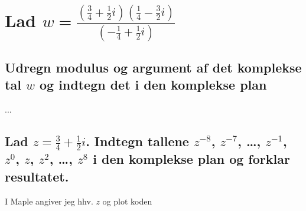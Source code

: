 \documentclass[11pt,a4paper]{article}
\begin{document}
\section{\mdseries
    Lad $w = \frac
        {
        \left(
            \frac{3}{4} + \frac{1}{2}i
        \right)
        \left(
             \frac{1}{4} - \frac{3}{2}i
        \right)
        }
        {
        \left(
            -\frac{1}{4} + \frac{1}{2}i
        \right)
        }$
}

\subsection{\mdseries Udregn modulus og argument af det komplekse tal $w$ og
    indtegn det i den komplekse plan}
...

\subsection{\mdseries Lad $z = \frac{3}{4} + \frac{1}{2}i$. Indtegn tallene
$z^{-8}$, $z^{-7}$, \dots, $z^{-1}$, $z^0$, $z$, $z^2$, \dots, $z^8$ i den
komplekse plan og forklar resultatet.}
I Maple angiver jeg hhv. $z$ og plot koden
\end{document}
